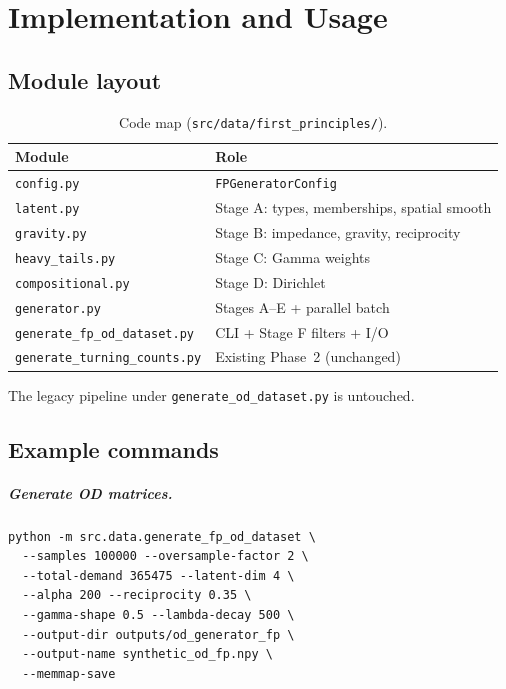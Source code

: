 \documentclass[11pt,a4paper]{report}
\begin{document}
\chapter{Implementation and Usage}
\label{ch:fp-impl}

\section{Module layout}

\begin{table}[ht]
\centering
\caption{Code map (\texttt{src/data/first\_principles/}).}
\label{tab:fp-code}
\small
\begin{tabular}{@{}ll@{}}
\toprule
\textbf{Module} & \textbf{Role} \\
\midrule
\texttt{config.py} & \texttt{FPGeneratorConfig} \\
\texttt{latent.py} & Stage A: types, memberships, spatial smooth \\
\texttt{gravity.py} & Stage B: impedance, gravity, reciprocity \\
\texttt{heavy\_tails.py} & Stage C: Gamma weights \\
\texttt{compositional.py} & Stage D: Dirichlet \\
\texttt{generator.py} & Stages A--E + parallel batch \\
\texttt{generate\_fp\_od\_dataset.py} & CLI + Stage F filters + I/O \\
\midrule
\texttt{generate\_turning\_counts.py} & Existing Phase~2 (unchanged) \\
\bottomrule
\end{tabular}
\end{table}

The legacy pipeline under \texttt{generate\_od\_dataset.py} is untouched.

\section{Example commands}

\paragraph{Generate OD matrices.}
\begin{verbatim}
python -m src.data.generate_fp_od_dataset \
  --samples 100000 --oversample-factor 2 \
  --total-demand 365475 --latent-dim 4 \
  --alpha 200 --reciprocity 0.35 \
  --gamma-shape 0.5 --lambda-decay 500 \
  --output-dir outputs/od_generator_fp \
  --output-name synthetic_od_fp.npy \
  --memmap-save
\end{verbatim}
\end{document}
